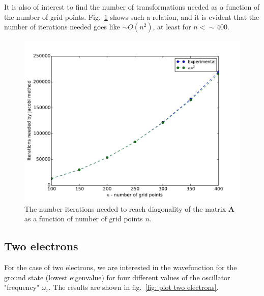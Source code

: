 \documentclass[11pt, a4paper]{article}
\newcommand{\A}{\mathbf{A}}
\begin{document}
			It is also of interest to find the number of transformations needed as a function of the number of grid points. Fig.~\ref{fig: number of iterations vs number og grid points} shows such a relation, and it is evident that the number of iterations needed goes like $\sim O(n^2)$, at least for $n<\sim400$. 
				\begin{figure}
					\centering
					\includegraphics[scale=0.7, clip=true, trim= 0 0 0 0]{plot-grid-pointsVSiterations}
					\caption{The number iterations needed to reach diagonality of the matrix $\A$ as a function of number of grid points $n$.}
					\label{fig: number of iterations vs number og grid points}
				\end{figure}
				
		
		\subsection{Two electrons}
			For the case of two electrons, we are interested in the wavefunction for the ground state (lowest eigenvalue) for four different values of the oscillator "frequency" $\omega_r$. The results are shown in fig.~\ref{fig: plot two electrons}.
			
\end{document}
